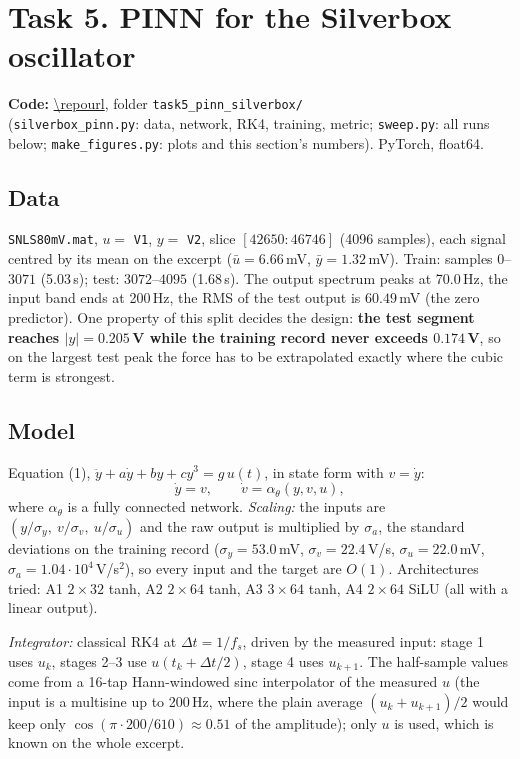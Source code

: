 \section*{Task 5. PINN for the Silverbox oscillator}
\textbf{Code:} \url{\repourl}, folder \texttt{task5\_pinn\_silverbox/}\\
(\texttt{silverbox\_pinn.py}: data, network, RK4, training, metric; \texttt{sweep.py}: all runs below;
\texttt{make\_figures.py}: plots and this section's numbers). PyTorch, float64.

\subsection*{Data}
\texttt{SNLS80mV.mat}, $u=$ \texttt{V1}, $y=$ \texttt{V2}, slice $[42650:46746]$ (4096 samples), each signal centred by its mean
on the excerpt ($\bar u=6.66$\,mV, $\bar y=1.32$\,mV). Train: samples $0$--$3071$ (5.03\,s); test: $3072$--$4095$ (1.68\,s).
The output spectrum peaks at 70.0\,Hz, the input band ends at 200\,Hz, the RMS of the test output is $60.49$\,mV (the zero
predictor). One property of this split decides the design: \textbf{the test segment reaches $|y|=0.205$\,V while the training
record never exceeds $0.174$\,V}, so on the largest test peak the force has to be extrapolated exactly where the cubic term is
strongest.

\subsection*{Model}
Equation (1), $\ddot y+a\dot y+by+cy^3=g\,u(t)$, in state form with $v=\dot y$:
\[
\dot y=v,\qquad \dot v=\alpha_\theta(y,v,u),
\]
where $\alpha_\theta$ is a fully connected network. \emph{Scaling:} the inputs are $(y/\sigma_y,\ v/\sigma_v,\ u/\sigma_u)$ and
the raw output is multiplied by $\sigma_a$, the standard deviations on the training record ($\sigma_y=53.0$\,mV,
$\sigma_v=22.4$\,V/s, $\sigma_u=22.0$\,mV, $\sigma_a=1.04\cdot10^{4}$\,V/s$^2$), so every input and the target are $O(1)$.
Architectures tried: A1 $2\times32$ tanh, A2 $2\times64$ tanh, A3 $3\times64$ tanh, A4 $2\times64$ SiLU (all with a linear output).

\emph{Integrator:} classical RK4 at $\Delta t=1/f_s$, driven by the measured input: stage 1 uses $u_k$, stages 2--3 use
$u(t_k+\Delta t/2)$, stage 4 uses $u_{k+1}$. The half-sample values come from a 16-tap Hann-windowed sinc interpolator of the
measured $u$ (the input is a multisine up to 200\,Hz, where the plain average $(u_k+u_{k+1})/2$ would keep only
$\cos(\pi\cdot200/610)\approx0.51$ of the amplitude); only $u$ is used, which is known on the whole excerpt.

